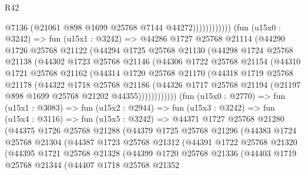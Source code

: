 \begin{lexlean}{R42}
\begin{coremodule}
                              @7136
                              (@21061 @898 @1699 @25768 @7144 @44272))))))))))))
        (fun (u15x0 : @3242) =>
        fun (u15x1 : @3242) =>
        @44286
          @1727
          @25768
          @21114
          (@44290
            @1726
            @25768
            @21122
            (@44294
              @1725
              @25768
              @21130
              (@44298
                @1724
                @25768
                @21138
                (@44302
                  @1723
                  @25768
                  @21146
                  (@44306
                    @1722
                    @25768
                    @21154
                    (@44310
                      @1721
                      @25768
                      @21162
                      (@44314
                        @1720
                        @25768
                        @21170
                        (@44318
                          @1719
                          @25768
                          @21178
                          (@44322
                            @1718
                            @25768
                            @21186
                            (@44326
                              @1717
                              @25768
                              @21194
                              (@21197 @898 @1699 @25768 @21202 @44355))))))))))))
        (fun (u15x0 : @2770) =>
        fun (u15x1 : @3083) =>
        fun (u15x2 : @2944) =>
        fun (u15x3 : @3242) =>
        fun (u15x4 : @3116) =>
        fun (u15x5 : @3242) =>
        @44371
          @1727
          @25768
          @21280
          (@44375
            @1726
            @25768
            @21288
            (@44379
              @1725
              @25768
              @21296
              (@44383
                @1724
                @25768
                @21304
                (@44387
                  @1723
                  @25768
                  @21312
                  (@44391
                    @1722
                    @25768
                    @21320
                    (@44395
                      @1721
                      @25768
                      @21328
                      (@44399
                        @1720
                        @25768
                        @21336
                        (@44403
                          @1719
                          @25768
                          @21344
                          (@44407
                            @1718
                            @25768
                            @21352

\end{coremodule}
\end{lexlean}
